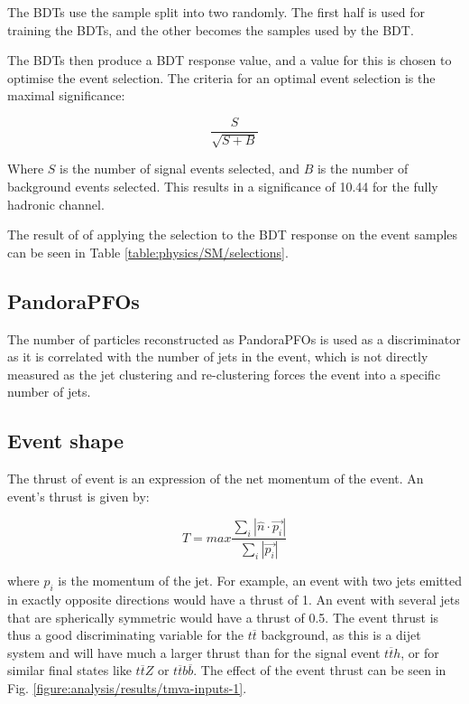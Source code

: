 The \acrshort{BDT}s use the sample split into two randomly. The first half is used for training the \acrshort{BDT}s, and the other becomes the samples used by the \acrshort{BDT}.

The BDTs then produce a BDT response value, and a value for this is chosen to optimise the event selection. The criteria for an optimal event selection is the maximal significance:

\begin{equation}
	\frac{S}{\sqrt{S + B}}
\label{eq:significance}
\end{equation}

Where $S$ is the number of signal events selected, and $B$ is the number of background events selected. This results in a significance of 10.44 for the fully hadronic channel.

The result of of applying the selection to the BDT response on the event samples can be seen in Table \ref{table:physics/SM/selections}.

\subsection{PandoraPFOs}
The number of particles reconstructed as Pandora\acrshort{PFO}s is used as a discriminator as it is correlated with the number of jets in the event, which is not directly measured as the jet clustering and re-clustering forces the event into a specific number of jets. 


\subsection{Event shape}
The thrust of event is an expression of the net momentum of the event. An event's thrust is given by:

\begin{equation}
	T = max \frac{\sum_i | \hat{n} \cdot \overrightarrow{p_i} |}{\sum_i | \overrightarrow{p_i} |}
\label{eq:thrust}
\end{equation}

where $p_i$ is the momentum of the jet. For example, an event with two jets emitted in exactly opposite directions would have a thrust of 1. An event with several jets that are spherically symmetric would have a thrust of 0.5. The event thrust is thus a good discriminating variable for the $t\overline{t}$ background, as this is a dijet system and will have much a larger thrust than for the signal event $t\overline{t}h$, or for similar final states like $t\overline{t}Z$ or $t\overline{t}b\overline{b}$. The effect of the event thrust can be seen in Fig. \ref{figure:analysis/results/tmva-inputs-1}.

